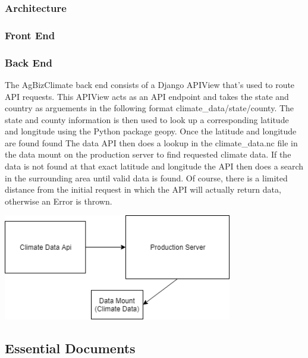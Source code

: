 \documentclass[onecolumn, draftclsnofoot,10pt, compsoc]{article}
\begin{document}
        \subsubsection{Architecture}
        
        \subsubsection{Front End}
        
        \subsubsection{Back End}
        The AgBizClimate back end consists of a Django APIView that's used to route API requests. This APIView acts as an API endpoint and takes the state and country as arguements in the following format climate\_data/state/county. The state and county information is then used to look up a corresponding latitude and longitude using the Python package geopy. Once the latitude and longitude are found found The data API then does a lookup in the climate\_data.nc file in the data mount on the production server to find requested climate data. If the data is not found at that exact latitude and longitude the API then does a search in the surrounding area until valid data is found. Of course, there is a limited distance from the initial request in which the API will actually return data, otherwise an Error is thrown.
        \begin{center}
        \includegraphics[width=10cm]{./Images/backend.png}
        \end{center}
        
        
 
    \subsection{Essential Documents}
            

\end{document}
